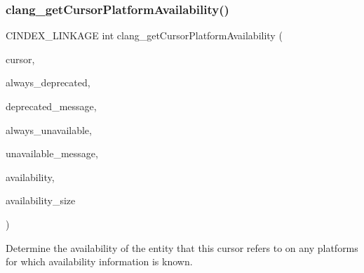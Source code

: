 \subsubsection{\texorpdfstring{clang\+\_\+get\+Cursor\+Platform\+Availability()}{clang\_getCursorPlatformAvailability()}}
{\footnotesize\ttfamily C\+I\+N\+D\+E\+X\+\_\+\+L\+I\+N\+K\+A\+GE int clang\+\_\+get\+Cursor\+Platform\+Availability (\begin{DoxyParamCaption}\item[{\mbox{\hyperlink{structCXCursor}{C\+X\+Cursor}}}]{cursor,  }\item[{int $\ast$}]{always\+\_\+deprecated,  }\item[{\mbox{\hyperlink{structCXString}{C\+X\+String}} $\ast$}]{deprecated\+\_\+message,  }\item[{int $\ast$}]{always\+\_\+unavailable,  }\item[{\mbox{\hyperlink{structCXString}{C\+X\+String}} $\ast$}]{unavailable\+\_\+message,  }\item[{\mbox{\hyperlink{structCXPlatformAvailability}{C\+X\+Platform\+Availability}} $\ast$}]{availability,  }\item[{int}]{availability\+\_\+size }\end{DoxyParamCaption})}



Determine the availability of the entity that this cursor refers to on any platforms for which availability information is known. 


